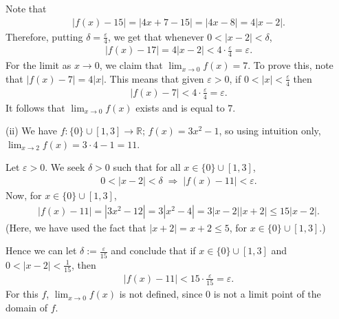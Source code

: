 \documentclass[letterpaper,10pt,english]{jupyterBook}
\begin{document}
\sphinxAtStartPar
Note that
\begin{equation*}
\begin{split}
|f(x)-15| = |4x+7-15| = |4x-8| = 4|x-2|.
\end{split}
\end{equation*}
\sphinxAtStartPar
Therefore, putting \(\delta=\frac{\varepsilon}{4}\), we get that whenever \(0<|x-2|<\delta\),
\begin{equation*}
\begin{split}
|f(x)-17| = 4|x-2| < 4\cdot\frac{\varepsilon}{4} = \varepsilon.
\end{split}
\end{equation*}
\sphinxAtStartPar
For the limit as \(x\rightarrow 0\), we claim that \(\lim_{x\rightarrow 0}f(x)=7\). To prove this, note that \(|f(x)-7|=4|x|\). This means that given \(\varepsilon>0\), if \(0<|x|<\frac{\varepsilon}{4}\) then
\begin{equation*}
\begin{split}
|f(x)-7|<4\cdot\frac{\varepsilon}{4} = \varepsilon.
\end{split}
\end{equation*}
\sphinxAtStartPar
It follows that \(\lim_{x\rightarrow 0}f(x)\) exists and is equal to \(7\).

\sphinxAtStartPar
(ii) We have \(f:\{0\}\cup[1,3]\to\mathbb{R}\); \(f(x)=3x^2-1\), so using intuition only, \(\lim_{x\rightarrow 2} f(x)=3\cdot 4-1=11\).

\sphinxAtStartPar
Let \(\varepsilon>0\). We seek \(\delta>0\) such that for all \(x\in\{0\}\cup[1,3]\),
\begin{equation*}
\begin{split}
0<|x-2|<\delta \; \Rightarrow \; |f(x)-11|<\varepsilon.
\end{split}
\end{equation*}
\sphinxAtStartPar
Now, for \(x\in\{0\}\cup[1,3]\),
\begin{equation*}
\begin{split}
|f(x)-11| = |3x^2-12| = 3|x^2-4| = 3|x-2||x+2| \leq 15|x-2|.
\end{split}
\end{equation*}
\sphinxAtStartPar
(Here, we have used the fact that \(|x+2| = x+2 \leq 5\), for \(x\in\{0\}\cup[1,3]\).)

\sphinxAtStartPar
Hence we can let \(\delta:=\frac{\varepsilon}{15}\) and conclude that if \(x\in\{0\}\cup[1,3]\) and \(0<|x-2|<\frac{1}{15}\), then
\begin{equation*}
\begin{split}
|f(x)-11|<15\cdot\frac{\varepsilon}{15} =\varepsilon.
\end{split}
\end{equation*}
\sphinxAtStartPar
For this \(f\), \(\lim_{x\rightarrow 0}f(x)\) is not defined, since \(0\) is not a limit point of the domain of \(f\).
\end{document}

